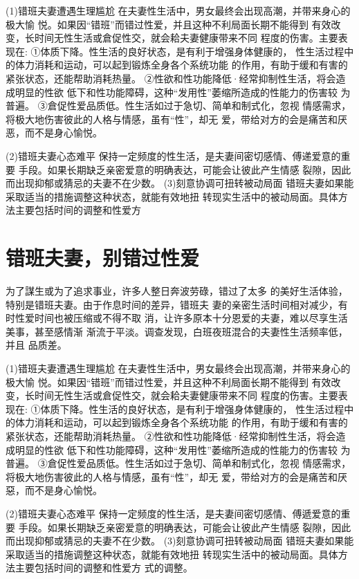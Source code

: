 \documentclass[12pt,UTF8]{ctexbook}
\begin{document}
(1)错班夫妻遭遇生理尴尬
在夫妻性生活中，男女最终会出现高潮，并带来身心的极大愉
悦。如果因“错班”而错过性爱，并且这种不利局面长期不能得到
有效改变，长时间无性生活或倉促性交，就会耠夫妻健康带来不同
程度的伤害。主要表现在:
①体质下降。性生活的良好状态，是有利于增强身体健康的，
性生活过程中的体力消耗和运动，可以起到锻炼全身各个系统功能
的作用，有助于缓和有害的紧张状态，还能帮助消耗热量。
②性欲和性功能降低·经常抑制性生活，将会造成明显的性欲
低下和性功能障碍，这种“发用性”萎缩所造成的性能力的伤害较
为普遍。
③倉促性爱品质低。性生活如过于急切、简单和制式化，忽视
情感需求，将极大地伤害彼此的人格与情感，虽有“性”，却无
爱，带给对方的会是痛苦和厌恶，而不是身心愉悦。

(2)错班夫妻心态难平
保持一定频度的性生活，是夫妻间密切感情、傅递爱意的重要
手段。如果长期缺乏亲密爱意的明确表达，可能会让彼此产生情感
裂隙，因此而出现抑郁或猜忌的夫妻不在少数。
(3)刻意协调可扭转被动局面
错班夫妻如果能采取适当的措施调整这种状态，就能有效地扭
转现实生活中的被动局面。具体方法主要包括时间的调整和性爱方


\section{错班夫妻，别错过性爱}

为了謀生或为了追求事业，许多人整日奔波劳碌，错过了太多
的美好生活体验，特别是错班夫妻。由于作息时间的差异，错班夫
妻的亲密生活时间相对减少，有时性爱时间也被压缩或不得不取
消，让许多原本十分恩爱的夫妻，难以尽享生活美事，甚至感情渐
渐流于平淡。调查发现，白班夜班混合的夫妻性生活频率低，并且
品质差。

(1)错班夫妻遭遇生理尴尬
在夫妻性生活中，男女最终会出现高潮，并带来身心的极大愉
悦。如果因“错班”而错过性爱，并且这种不利局面长期不能得到
有效改变，长时间无性生活或倉促性交，就会耠夫妻健康带来不同
程度的伤害。主要表现在:
①体质下降。性生活的良好状态，是有利于增强身体健康的，
性生活过程中的体力消耗和运动，可以起到锻炼全身各个系统功能
的作用，有助于缓和有害的紧张状态，还能帮助消耗热量。
②性欲和性功能降低·经常抑制性生活，将会造成明显的性欲
低下和性功能障碍，这种“发用性”萎缩所造成的性能力的伤害较
为普遍。
③倉促性爱品质低。性生活如过于急切、简单和制式化，忽视
情感需求，将极大地伤害彼此的人格与情感，虽有“性”，却无
爱，带给对方的会是痛苦和厌惡，而不是身心愉悦。

(2)错班夫妻心态难平
保持一定频度的性生活，是夫妻间密切感情、傅遞爱意的重要
手段。如果长期缺乏亲密爱意的明确表达，可能会让彼此产生情感
裂隙，因此而出现抑郁或猜忌的夫妻不在少数。
(3)刻意协调可扭转被动局面
错班夫妻如果能采取适当的措施调整这种状态，就能有效地扭
转现实生活中的被动局面。具体方法主要包括时间的调整和性爱方
式的调整。
\end{document}
